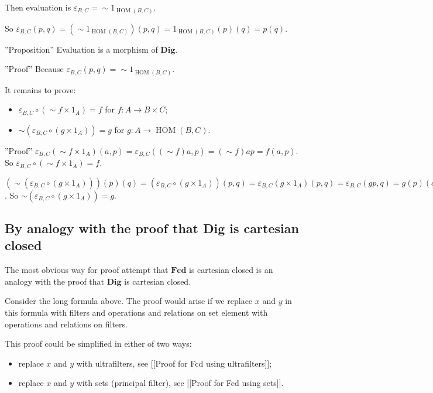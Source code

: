 Then evaluation is $\varepsilon_{B, C} = \mathop{\sim} 1_{\operatorname{HOM}(B,C)}$.

So $\varepsilon_{B, C} ( p , q) = ( \mathop{\sim} 1_{\operatorname{HOM}(B,C)}) ( p , q) = 1_{\operatorname{HOM}(B,C)} ( p) ( q) = p ( q)$.

''Proposition'' Evaluation is a morphism of $\mathbf{Dig}$.

''Proof'' Because $\varepsilon_{B, C} ( p , q) = \mathop{\sim} 1_{\operatorname{HOM}(B,C)}$.

It remains to prove:
\begin{itemize}
\item $\varepsilon_{B, C} \circ ( \sim f \times 1_{A}) = f$ for $f : A \rightarrow B \times C$;
\item $\sim ( \varepsilon_{B, C} \circ ( g \times 1_{A})) = g$ for $g : A \rightarrow \operatorname{HOM} ( B , C)$.
\end{itemize}

''Proof'' $\varepsilon_{B, C} ( \sim f \times 1_{A}) ( a , p) = \varepsilon_{B, C} ( ( \sim f) a , p) = ( \sim f) a p = f ( a , p)$. So $\varepsilon_{B, C} \circ ( \sim f \times 1_{A}) = f$.

  $(\sim ( \varepsilon_{B, C} \circ ( g \times 1_{A}))) ( p) ( q) = ( \varepsilon_{B, C} \circ ( g \times 1_{A})) ( p , q) = \varepsilon_{B, C} ( g \times 1_{A}) ( p , q) = \varepsilon_{B, C} ( g p , q) = g ( p) ( q)$. So $\sim ( \varepsilon_{B, C} \circ ( g \times 1_{A})) = g$.

\subsection{By analogy with the proof that Dig is cartesian closed}

The most obvious way for proof attempt that $\mathbf{Fcd}$ is cartesian closed is an analogy with the proof that
$\mathbf{Dig}$ is cartesian closed.

Consider the long formula above. The proof would arise if we replace $x$ and $y$ in this formula with filters and operations and relations on set element with operations and relations on filters.

This proof could be simplified in either of two ways:
\begin{itemize}
\item replace $x$ and $y$ with ultrafilters, see [[Proof for Fcd using ultrafilters]];
\item replace $x$ and $y$ with sets (principal filter), see [[Proof for Fcd using sets]].
\end{itemize}

